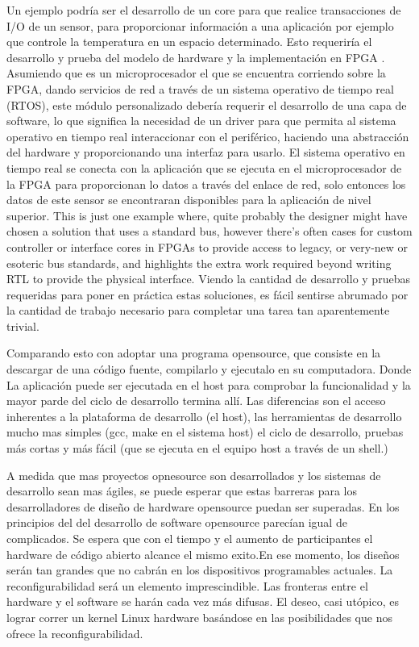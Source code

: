 \documentclass[a4paper,11pt]{article}
\begin{document}
Un ejemplo podría ser el desarrollo de un core para que realice transacciones de I/O de un sensor, para proporcionar información a una aplicación por ejemplo que controle la temperatura en un espacio determinado. Esto requeriría el desarrollo y prueba del modelo de hardware y la implementación en FPGA . Asumiendo que es un microprocesador el que se encuentra corriendo sobre la FPGA, dando servicios de red a través de un sistema operativo de tiempo real (RTOS), este módulo personalizado debería requerir el desarrollo de una capa de software, lo que significa la necesidad de un driver para que permita al sistema operativo en tiempo real interaccionar con el periférico, haciendo una abstracción del hardware y proporcionando una interfaz para usarlo. El sistema operativo en tiempo real se conecta con la aplicación que se ejecuta en el microprocesador de la FPGA para proporcionan lo datos a través del enlace de red, solo entonces los datos de este sensor se encontraran disponibles para la aplicación de nivel superior. This is just one example where, quite probably the designer might have chosen a solution that uses a standard bus, however there’s often cases for custom controller or interface cores in FPGAs to provide
access to legacy, or very-new or esoteric bus standards, and highlights the extra work required beyond writing RTL to provide the physical interface.
Viendo la cantidad de desarrollo y pruebas requeridas para poner en práctica estas soluciones, es fácil sentirse abrumado por la cantidad de trabajo necesario para completar una tarea tan aparentemente trivial.

Comparando esto con adoptar una programa opensource, que consiste en la descargar de una código fuente, compilarlo y ejecutalo en su computadora. Donde La aplicación puede ser ejecutada en el  host para comprobar la funcionalidad y la mayor parde del ciclo de desarrollo termina allí. Las diferencias son el acceso inherentes a la plataforma de desarrollo (el host), las herramientas de desarrollo mucho mas simples (gcc, make en el sistema host) el ciclo de desarrollo, pruebas más cortas y más fácil (que se ejecuta en el equipo host a través de un shell.)

A medida que mas proyectos opnesource son desarrollados y los sistemas de desarrollo sean mas ágiles, se puede esperar que estas barreras para los desarrolladores de diseño de hardware opensource puedan ser superadas. En los principios del del desarrollo de software opensource parecían igual de complicados. Se espera que con el tiempo y el aumento de participantes el hardware de código abierto alcance el mismo exito.En ese momento, los diseños serán tan grandes que no cabrán en los dispositivos programables actuales. La reconfigurabilidad será un elemento imprescindible. Las fronteras entre el hardware y el software se harán cada vez más difusas. El deseo, casi utópico, es lograr correr un kernel Linux hardware basándose en las posibilidades que nos ofrece la reconfigurabilidad. 
	
\end{document}
